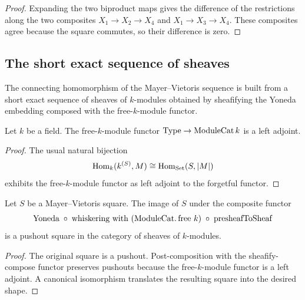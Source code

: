 \begin{proof}
  \leanok

  Expanding the two biproduct maps gives the difference of the restrictions along the two composites \(X_1\to X_2\to X_4\) and \(X_1\to X_3\to X_4\). These composites agree because the square commutes, so their difference is zero.
\end{proof}

\subsection{The short exact sequence of sheaves}

The connecting homomorphism of the Mayer--Vietoris sequence is built from a short exact sequence of sheaves of \(k\)-modules obtained by sheafifying the Yoneda embedding composed with the free-\(k\)-module functor.

\begin{definition}\label{mk-def:Scheme_ModuleCat_free_isLeftAdjoint}
  \leanok

  Let \(k\) be a field. The free-\(k\)-module functor \(\mathrm{Type} \to \mathrm{ModuleCat}\,k\) is a left adjoint.
\end{definition}

\begin{proof}
  \leanok
  The usual natural bijection
  \[
    \operatorname{Hom}_k(k^{(S)},M)\cong \operatorname{Hom}_{\mathrm{Set}}(S,|M|)
  \]
  exhibits the free-\(k\)-module functor as left adjoint to the forgetful functor.
\end{proof}

\begin{lemma}\label{mk-lem:Scheme_HModule_prime_isPushoutModuleCatFreeSheaf}
  \leanok


  Let \(S\) be a Mayer--Vietoris square. The image of \(S\) under the composite functor
  \[
    \text{Yoneda} \;\circ\; \text{whiskering with }(\mathrm{ModuleCat}.\operatorname{free}\,k) \;\circ\; \operatorname{presheafToSheaf}
  \]
  is a pushout square in the category of sheaves of \(k\)-modules.
\end{lemma}

\begin{proof}
  \leanok

  The original square is a pushout. Post-composition with the sheafify-compose functor preserves pushouts because the free-\(k\)-module functor is a left adjoint. A canonical isomorphism translates the resulting square into the desired shape.
\end{proof}

